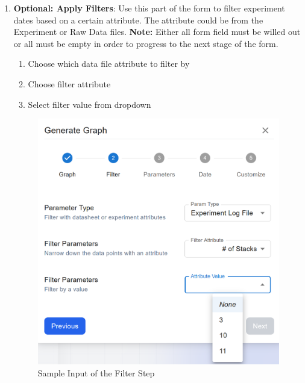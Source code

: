 \documentclass[12pt]{article}
\begin{document}
\begin{enumerate}
    \item \textbf{Optional: Apply Filters}: \newline
    Use this part of the form to filter experiment dates based on a certain
    attribute. The attribute could be from the Experiment or Raw Data files.
    \newline
    \textbf{Note:} Either all form field must be willed out or all must be empty in order
    to progress to the next stage of the form. 
    \begin{enumerate}
        \item Choose which data file attribute to filter by
        \item Choose filter attribute 
        \item Select filter value from dropdown
    \end{enumerate}
    \begin{figure}[H]
        \centering
        \includegraphics[scale=0.4]{./Diagrams/graph-filter.png}
        \caption{Sample Input of the Filter Step}
        \label{fig:filters}
    \end{figure}
    

\end{enumerate}
\end{document}
